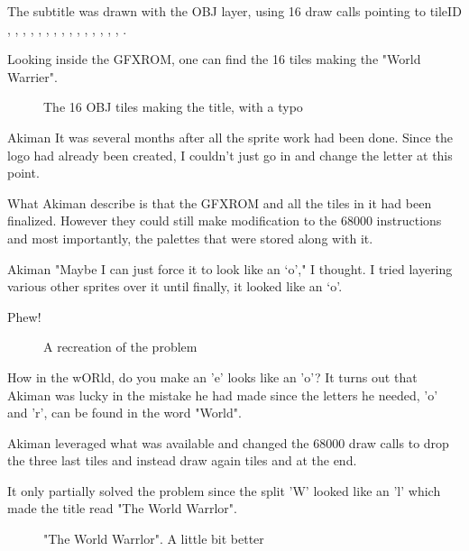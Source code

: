 The subtitle was drawn with the OBJ layer, using 16 draw calls pointing to tileID , , , , , , , , , , , , , , , . 

Looking inside the GFXROM, one can find the 16 tiles making the "World Warrier". 

\begin{figure}[H]
 \caption*{The 16 OBJ tiles making the title, with a typo}%
 \end{figure}%

\begin{q}{Akiman}
It was several months after all the sprite work had been done. Since the logo had already been created, I couldn't just go in and change the letter at this point.
\end{q}

What Akiman describe is that the GFXROM and all the tiles in it had been finalized. However they could still make modification to the 68000 instructions and most importantly, the palettes that were stored along with it.

\begin{q}{Akiman}
"Maybe I can just force it to look like an ‘o’," I thought. I tried layering various other sprites over it until finally, it looked like an ‘o’. 

Phew!
\end{q}

\begin{figure}[H]
 \caption*{A recreation of the problem}%
 \end{figure}%



How in the wORld, do you make an 'e' looks like an 'o'? It turns out that Akiman was lucky in the mistake he had made since the letters he needed, 'o' and 'r', can be found in the word "World".

Akiman leveraged what was available and changed the 68000 draw calls to drop the three last tiles and instead draw again tiles  and  at the end.

It only partially solved the problem since the split 'W' looked like an 'l' which made the title read "The World Warrlor". 

\begin{figure}[H]
 \caption*{"The World Warrlor". A little bit better}%
 \end{figure}%



